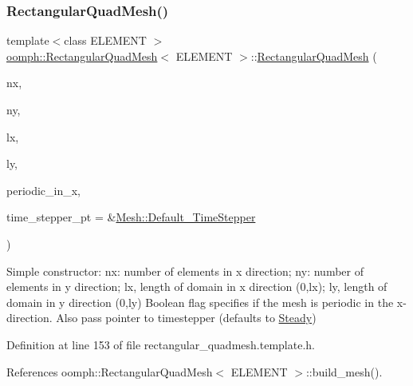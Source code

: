 \subsubsection{\texorpdfstring{Rectangular\+Quad\+Mesh()}{RectangularQuadMesh()}\hspace{0.1cm}{\footnotesize\ttfamily [4/5]}}
{\footnotesize\ttfamily template$<$class E\+L\+E\+M\+E\+NT $>$ \\
\hyperlink{classoomph_1_1RectangularQuadMesh}{oomph\+::\+Rectangular\+Quad\+Mesh}$<$ E\+L\+E\+M\+E\+NT $>$\+::\hyperlink{classoomph_1_1RectangularQuadMesh}{Rectangular\+Quad\+Mesh} (\begin{DoxyParamCaption}\item[{const unsigned \&}]{nx,  }\item[{const unsigned \&}]{ny,  }\item[{const double \&}]{lx,  }\item[{const double \&}]{ly,  }\item[{const bool \&}]{periodic\+\_\+in\+\_\+x,  }\item[{\hyperlink{classoomph_1_1TimeStepper}{Time\+Stepper} $\ast$}]{time\+\_\+stepper\+\_\+pt = {\ttfamily \&\hyperlink{classoomph_1_1Mesh_a12243d0fee2b1fcee729ee5a4777ea10}{Mesh\+::\+Default\+\_\+\+Time\+Stepper}} }\end{DoxyParamCaption})\hspace{0.3cm}{\ttfamily [inline]}}



Simple constructor\+: nx\+: number of elements in x direction; ny\+: number of elements in y direction; lx, length of domain in x direction (0,lx); ly, length of domain in y direction (0,ly) Boolean flag specifies if the mesh is periodic in the x-\/direction. Also pass pointer to timestepper (defaults to \hyperlink{classoomph_1_1Steady}{Steady}) 



Definition at line 153 of file rectangular\+\_\+quadmesh.\+template.\+h.



References oomph\+::\+Rectangular\+Quad\+Mesh$<$ E\+L\+E\+M\+E\+N\+T $>$\+::build\+\_\+mesh().

\mbox{\label{classoomph_1_1RectangularQuadMesh_ac36869a7d72ec7524b18272657cb6167}} 
